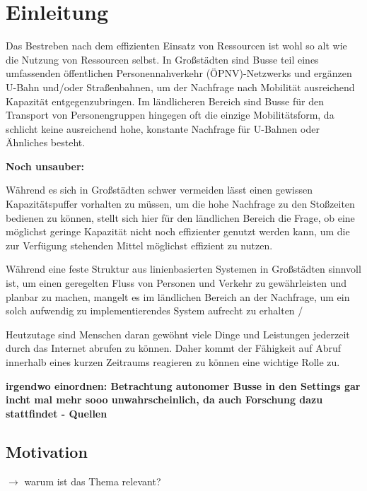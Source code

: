 \chapter{Einleitung}
\label{chapter:1}
Das Bestreben nach dem effizienten Einsatz von Ressourcen ist wohl so alt wie die Nutzung von Ressourcen selbst. In Großstädten sind Busse teil eines umfassenden öffentlichen Personennahverkehr (ÖPNV)-Netzwerks und ergänzen U-Bahn und/oder Straßenbahnen, um der Nachfrage nach Mobilität ausreichend Kapazität entgegenzubringen. Im ländlicheren Bereich sind Busse für den Transport von Personengruppen hingegen oft die einzige Mobilitätsform, da schlicht keine ausreichend hohe, konstante Nachfrage für U-Bahnen oder Ähnliches besteht.

\textbf{Noch unsauber:}

Während es sich in Großstädten schwer vermeiden lässt einen gewissen Kapazitätspuffer vorhalten zu müssen, um die hohe Nachfrage zu den Stoßzeiten bedienen zu können, stellt sich hier für den ländlichen Bereich die Frage, ob eine möglichst geringe Kapazität nicht noch effizienter genutzt werden kann, um die zur Verfügung stehenden Mittel möglichst effizient zu nutzen.

Während eine feste Struktur aus linienbasierten Systemen in Großstädten sinnvoll ist, um einen geregelten Fluss von Personen und Verkehr zu gewährleisten und planbar zu machen, mangelt es im ländlichen Bereich an der Nachfrage, um ein solch aufwendig zu implementierendes System aufrecht zu erhalten / 


Heutzutage sind Menschen daran gewöhnt viele Dinge und Leistungen jederzeit durch das Internet abrufen zu können. Daher kommt der Fähigkeit auf Abruf innerhalb eines kurzen Zeitraums reagieren zu können eine wichtige Rolle zu.   


\textbf{irgendwo einordnen: Betrachtung autonomer Busse in den Settings gar incht mal mehr sooo unwahrscheinlich, da auch Forschung dazu stattfindet - Quellen}

\section{Motivation} 
\label{sec:1.1}
$\rightarrow$ warum ist das Thema relevant?


